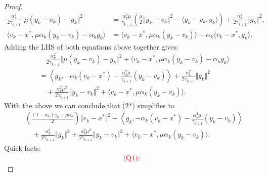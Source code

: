 \documentclass[12pt]{article}
\begin{document}
\begin{proof}
\begin{align*}
            \frac{\alpha^2_k}{2\gamma_{k + 1}} 
            \Vert \mu(y_k - v_k) - g_k\Vert^2
            & = 
            \frac{\alpha_k^2\mu}{\gamma_{k + 1}}
            \left(
                \frac{\mu}{2}\Vert y_k - v_k\Vert^2 
                - \langle y_k - v_k, g_k\rangle
            \right)
            + \frac{\alpha_k^2}{2\gamma_{k + 1}}\Vert g_k\Vert^2, 
            \\
            \langle v_k - x^*, \mu \alpha_k(y_k - v_k) - \alpha_k g_k\rangle
            &= 
            \langle v_k - x^*, \mu\alpha_k(y_k - v_k)\rangle 
            - \alpha_k \langle v_k - x^*, g_k\rangle. 
        \tag{2.1*}
        \end{align*}
        Adding the LHS of both equations above together gives: 
        \begin{align*}
            & \quad 
            \frac{\alpha^2_k}{2\gamma_{k + 1}} 
            \Vert \mu(y_k - v_k) - g_k\Vert^2
            + 
            \langle v_k - x^*, \mu \alpha_k(y_k - v_k) - \alpha_k g_k\rangle
            \\
            &= 
            \left\langle g_k, 
                - \alpha_k(v_k - x^*) 
                - \frac{\alpha_k^2\mu}{\gamma_{k + 1}}(y_k - v_k)
            \right\rangle
            + \frac{\alpha_k^2}{2\gamma_{k + 1}}\Vert g_k\Vert^2
            \\
                &\quad 
                + \frac{\alpha_k^2 \mu^2}{2\gamma_{k + 1}}\Vert y_k - v_k\Vert^2
                + \langle v_k - x^*, \mu\alpha_k(y_k - v_k)\rangle. 
        \end{align*}
        With the above we can conclude that (2*) simplifies to 
        {\small
        \begin{align*} 
            & 
            \left(
            \frac{(1 - \alpha_k)\gamma_k + \mu \alpha_k}{2} 
            \right)\Vert v_k - x^*\Vert^2
            + 
            \left\langle g_k, 
                - \alpha_k(v_k - x^*) 
                - \frac{\alpha_k^2\mu}{\gamma_{k + 1}}(y_k - v_k)
            \right\rangle
            \\
            & \quad 
                + \frac{\alpha_k^2}{2\gamma_{k + 1}}\Vert g_k\Vert^2
                + \frac{\alpha_k^2 \mu^2}{2\gamma_{k + 1}}\Vert y_k - v_k\Vert^2
                + \langle v_k - x^*, \mu\alpha_k(y_k - v_k)\rangle. 
        \tag{2.2*}
        \end{align*}
        }
        Quick facts: 
        \textcolor{red}{
        \begin{align*}
            \text{(Q1)}: 

\end{align*}}
\end{proof}
\end{document}
